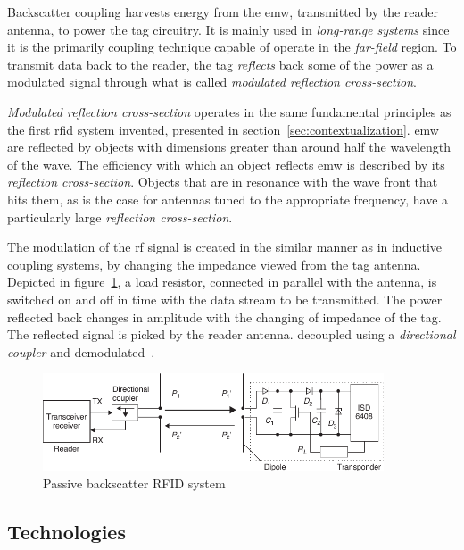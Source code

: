 
Backscatter coupling harvests energy from the \ac{emw}, transmitted by the reader antenna, to power the tag circuitry. It is mainly used in \emph{long-range systems} since it is the primarily coupling technique capable of operate in the \emph{far-field} region.
To transmit data back to the reader, the tag \textit{reflects} back some of the power as a modulated signal through what is called \emph{modulated reflection cross-section}.

\emph{Modulated reflection cross-section} operates in the same fundamental principles as the first \ac{rfid} system invented, presented in section~\ref{sec:contextualization}.
\ac{emw} are reflected by objects with dimensions greater than around half the wavelength of the wave.
The efficiency with which an object reflects \ac{emw} is described by its \emph{reflection cross-section}. Objects that are in resonance with the wave front that hits them, as is the case for antennas tuned to the appropriate frequency, have a particularly large \emph{reflection cross-section}.

The modulation of the \ac{rf} signal is created in the similar manner as in inductive coupling systems, by changing the impedance viewed from the tag antenna. 
Depicted in figure~\ref{fig:backscatter}, a load resistor, connected in parallel with the antenna, is switched on and off in time with the data stream to be transmitted.
The power reflected back changes in amplitude with the changing of impedance of the tag.
The reflected signal is picked by the reader antenna. decoupled using a \emph{directional coupler} and demodulated~\cite{finkenzellerRFIDHandbookFundamentals2003, RFIDCouplingTechniques}.

\begin{figure}[!ht]
    \centering
    \includegraphics[width=0.9\textwidth]{./figs/02-state-of-the-art/backscatter.pdf}
    \caption{Passive backscatter RFID system~\cite{finkenzellerRFIDHandbookFundamentals2003}} 
    \label{fig:backscatter}
\end{figure}

\subsection{Technologies} \label{sec:opfrequency}

